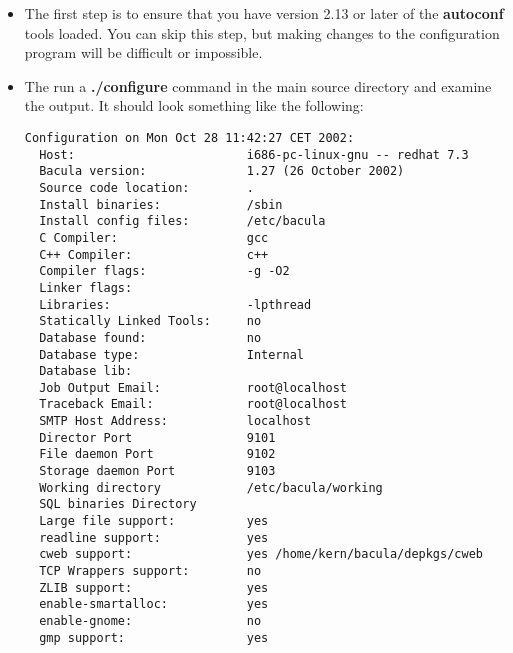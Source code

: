 \begin{itemize}
\item The first step is to ensure that you have version 2.13 or later  of the
   {\bf autoconf} tools loaded. You can skip this step, but  making changes to
   the configuration program will be difficult or  impossible. 
\item The run a {\bf ./configure} command in the main source directory  and
   examine the output. It should look something like the  following:  

\footnotesize
\begin{verbatim}
Configuration on Mon Oct 28 11:42:27 CET 2002:
  Host:                        i686-pc-linux-gnu -- redhat 7.3
  Bacula version:              1.27 (26 October 2002)
  Source code location:        .
  Install binaries:            /sbin
  Install config files:        /etc/bacula
  C Compiler:                  gcc
  C++ Compiler:                c++
  Compiler flags:              -g -O2
  Linker flags:
  Libraries:                   -lpthread
  Statically Linked Tools:     no
  Database found:              no
  Database type:               Internal
  Database lib:
  Job Output Email:            root@localhost
  Traceback Email:             root@localhost
  SMTP Host Address:           localhost
  Director Port                9101
  File daemon Port             9102
  Storage daemon Port          9103
  Working directory            /etc/bacula/working
  SQL binaries Directory
  Large file support:          yes
  readline support:            yes
  cweb support:                yes /home/kern/bacula/depkgs/cweb
  TCP Wrappers support:        no
  ZLIB support:                yes
  enable-smartalloc:           yes
  enable-gnome:                no
  gmp support:                 yes
\end{verbatim}
\normalsize


\end{itemize}
